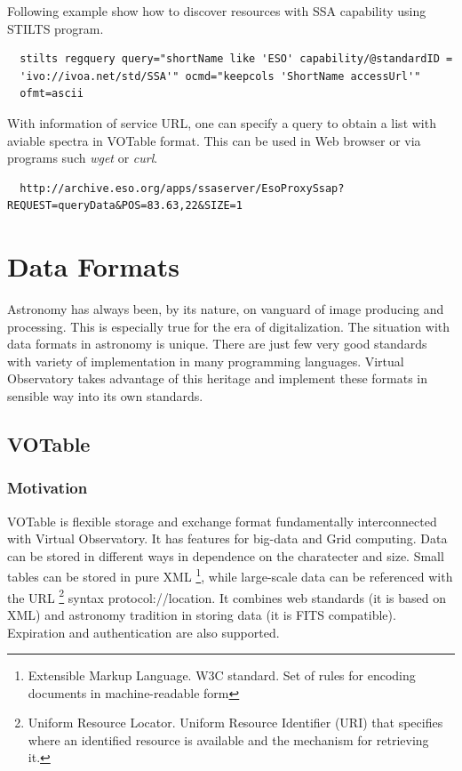 Following example show how to discover resources with SSA capability
using STILTS program. 

\begin{lstlisting}
  stilts regquery query="shortName like 'ESO' capability/@standardID =
  'ivo://ivoa.net/std/SSA'" ocmd="keepcols 'ShortName accessUrl'"
  ofmt=ascii
\end{lstlisting}

With information of service URL, one can specify a query to obtain a
list with aviable spectra in VOTable format. This can be used in Web
browser or via programs such \emph{wget} or \emph{curl}.

\begin{lstlisting}
  http://archive.eso.org/apps/ssaserver/EsoProxySsap?REQUEST=queryData&POS=83.63,22&SIZE=1
\end{lstlisting}

\section{Data Formats}
Astronomy has always been, by its nature, on vanguard of image
producing and processing. This is especially true for the era of
digitalization. The situation with data formats in astronomy is
unique. There are just few very good standards with variety of
implementation in many programming languages. Virtual Observatory
takes advantage of this heritage and implement these formats in
sensible way into its own standards. 
 
\subsection{VOTable}
\subsubsection*{Motivation}
VOTable is flexible storage and exchange format fundamentally
interconnected with Virtual Observatory. It has features for big-data
and Grid computing. Data can be stored in different ways in dependence
on the charatecter and size. Small tables can be stored in pure XML
\footnote{Extensible Markup Language. W3C standard. Set of rules for
  encoding documents in machine-readable form}, while large-scale data
can be referenced with the URL \footnote{Uniform Resource
  Locator. Uniform Resource Identifier (URI) that specifies where an
  identified resource is available and the mechanism for retrieving
  it.} syntax protocol://location.  It combines web standards (it is
based on XML) and astronomy tradition in storing data (it is FITS
compatible). Expiration and authentication are also supported.

